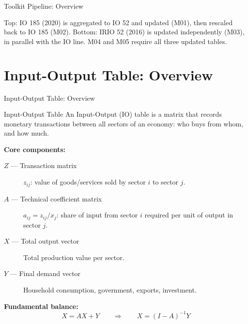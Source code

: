 \documentclass[aspectratio=169]{beamer}
\begin{document}
\begin{frame}{Toolkit Pipeline: Overview}
\begin{center}
\end{center}

\vspace{0.15cm}
{\footnotesize Top: IO 185 (2020) is aggregated to IO 52 and updated (M01), then rescaled back to IO 185 (M02). Bottom: IRIO 52 (2016) is updated independently (M03), in parallel with the IO line. M04 and M05 require all three updated tables.}
\end{frame}

\section{Input-Output Table: Overview}

\begin{frame}{Input-Output Table: Overview}
\tableofcontents[currentsection]
\end{frame}

\begin{frame}{Input-Output Table}
An Input-Output (IO) table is a matrix that records monetary transactions between all sectors of an economy: who buys from whom, and how much.

\medskip
\textbf{Core components:}
\begin{description}
  \item[$Z$ --- Transaction matrix] $z_{ij}$: value of goods/services sold by sector $i$ to sector $j$.
  \item[$A$ --- Technical coefficient matrix] $a_{ij} = z_{ij}/x_j$: share of input from sector $i$ required per unit of output in sector $j$.
  \item[$X$ --- Total output vector] Total production value per sector.
  \item[$Y$ --- Final demand vector] Household consumption, government, exports, investment.
\end{description}

\medskip
\textbf{Fundamental balance:}
\[
X = AX + Y \qquad \Rightarrow \qquad X = (I - A)^{-1}Y
\]
\end{frame}
\end{document}
